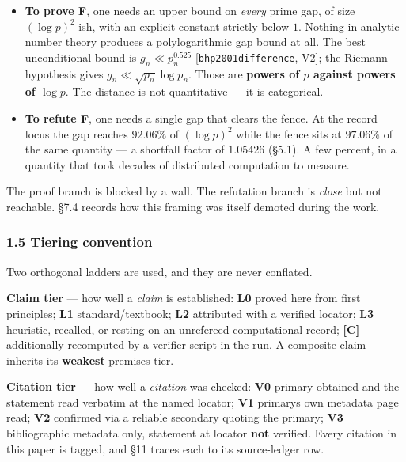 \documentclass[
  a4paper,
  11pt]{article}
\providecommand{\tightlist}{%
  \setlength{\itemsep}{0pt}\setlength{\parskip}{0pt}}
\begin{document}
\begin{itemize}
\tightlist
\item
  \textbf{To prove F}, one needs an upper bound on \emph{every} prime
  gap, of size \((\log p)^2\)-ish, with an explicit constant strictly
  below \(1\). Nothing in analytic number theory produces a
  polylogarithmic gap bound at all. The best unconditional bound is
  \(g_n \ll p_n^{0.525}\) {[}\texttt{bhp2001difference}, V2{]}; the
  Riemann hypothesis gives \(g_n \ll \sqrt{p_n}\log p_n\). Those are
  \textbf{powers of \(p\) against powers of \(\log p\)}. The distance is
  not quantitative --- it is categorical.
\item
  \textbf{To refute F}, one needs a single gap that clears the fence. At
  the record locus the gap reaches \(92.06\%\) of \((\log p)^2\) while
  the fence sits at \(97.06\%\) of the same quantity --- a shortfall
  factor of \(1.05426\) (§5.1). A few percent, in a quantity that took
  decades of distributed computation to measure.
\end{itemize}

The proof branch is blocked by a wall. The refutation branch is
\emph{close} but not reachable. §7.4 records how this framing was itself
demoted during the work.

\subsubsection{1.5 Tiering convention}\label{15-tiering-convention}

Two orthogonal ladders are used, and they are never conflated.

\textbf{Claim tier} --- how well a \emph{claim} is established:
\textbf{L0} proved here from first principles; \textbf{L1}
standard/textbook; \textbf{L2} attributed with a verified locator;
\textbf{L3} heuristic, recalled, or resting on an unrefereed
computational record; \textbf{{[}C{]}} additionally recomputed by a
verifier script in the run. A composite claim inherits its
\textbf{weakest} premise\textquotesingle s tier.

\textbf{Citation tier} --- how well a \emph{citation} was checked:
\textbf{V0} primary obtained and the statement read verbatim at the
named locator; \textbf{V1} primary\textquotesingle s own metadata page
read; \textbf{V2} confirmed via a reliable secondary quoting the
primary; \textbf{V3} bibliographic metadata only, statement at locator
\textbf{not} verified. Every citation in this paper is tagged, and §11
traces each to its source-ledger row.
\end{document}
